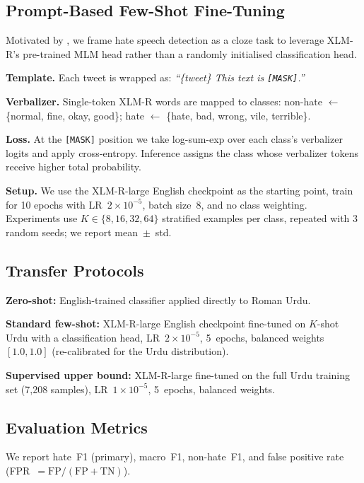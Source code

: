 \documentclass{article}
\begin{document}
\subsection{Prompt-Based Few-Shot Fine-Tuning}

Motivated by \citet{ullah2025prompt}, we frame hate speech detection as a cloze
task to leverage XLM-R's pre-trained MLM head rather than a randomly initialised
classification head.

\textbf{Template.} Each tweet is wrapped as:
\textit{``\{tweet\} This text is \texttt{[MASK]}.''}

\textbf{Verbalizer.}  Single-token XLM-R words are mapped to classes:
non-hate $\leftarrow$ \{normal, fine, okay, good\};
hate $\leftarrow$ \{hate, bad, wrong, vile, terrible\}.

\textbf{Loss.} At the \texttt{[MASK]} position we take log-sum-exp over each
class's verbalizer logits and apply cross-entropy.
Inference assigns the class whose verbalizer tokens receive higher total probability.

\textbf{Setup.} We use the XLM-R-large English checkpoint as the starting point,
train for 10 epochs with LR~$2\times10^{-5}$, batch size~8, and no class weighting.
Experiments use $K\in\{8,16,32,64\}$ stratified examples per class, repeated with
3 random seeds; we report mean~$\pm$~std.

\subsection{Transfer Protocols}

\textbf{Zero-shot:} English-trained classifier applied directly to Roman Urdu.

\textbf{Standard few-shot:} XLM-R-large English checkpoint fine-tuned on $K$-shot
Urdu with a classification head, LR~$2\times10^{-5}$, 5~epochs, balanced weights
$[1.0, 1.0]$ (re-calibrated for the Urdu distribution).

\textbf{Supervised upper bound:} XLM-R-large fine-tuned on the full Urdu training
set (7{,}208 samples), LR~$1\times10^{-5}$, 5~epochs, balanced weights.

\subsection{Evaluation Metrics}

We report hate~F1 (primary), macro~F1, non-hate~F1, and false positive rate
(FPR~$= \mathrm{FP}/(\mathrm{FP}+\mathrm{TN})$).
\end{document}
